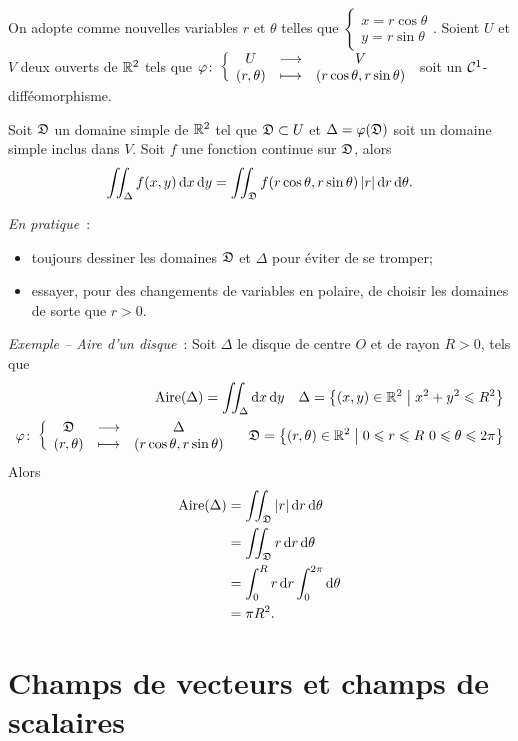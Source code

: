 \begin{theo}
  On adopte comme nouvelles variables $r$ et $\theta$ telles que $\begin{cases} x=r\cos\theta \\ y=r\sin\theta \end{cases}$. Soient $U$ et $V$ deux ouverts de $\mathbb{R}^2$ tels que $\varphi\colon \left\{\begin{array}{ccc} U & \longrightarrow &V\\ (r, \theta) & \longmapsto & (r\cos\theta, r\sin\theta) \end{array} \right.$ soit un $\mathcal{C}^{1}$-difféomorphisme.

Soit $\mathfrak{D}$ un domaine simple de $\mathbb{R}^2$ tel que $\mathfrak{D} \subset U$ et $\Delta=\varphi(\mathfrak{D})$ soit un domaine simple inclus dans $V$. Soit $f$ une fonction continue sur $\mathfrak{D}$, alors
\begin{equation}
   \iint_\Delta f(x,y)\mathop{}\mathopen{}\mathrm{d} x \mathop{}\mathopen{}\mathrm{d} y = \iint_{\mathfrak{D}} f(r\cos\theta, r\sin\theta) \left\lvert r\right\rvert\mathop{}\mathopen{}\mathrm{d} r \mathop{}\mathopen{}\mathrm{d} \theta.
\end{equation}
\end{theo}

\emph{En pratique}~:
\begin{itemize}
\item toujours dessiner les domaines $\mathfrak{D}$ et $\Delta$ pour éviter de se tromper;
\item essayer, pour des changements de variables en polaire, de choisir les domaines de sorte que $r>0$.
\end{itemize}

\emph{Exemple -- Aire d'un disque}~: Soit $\Delta$ le disque de centre $O$ et de rayon $R>0$, tels que
 \begin{align}
   \text{Aire}(\Delta) = \iint_\Delta \mathop{}\mathopen{}\mathrm{d} x \mathop{}\mathopen{}\mathrm{d} y \quad \Delta=\left\{(x,y)\in\mathbb{R}^2\mathrel{}\middle|\mathrel{}x^2+y^2\leqslant R^2\right\} \\
   \varphi\colon \left\{\begin{array}{ccc} \mathfrak{D} & \longrightarrow &\Delta\\ (r, \theta) & \longmapsto & (r\cos\theta, r\sin\theta) \end{array} \right. \quad \mathfrak{D}=\left\{(r,\theta)\in\mathbb{R}^2\mathrel{}\middle|\mathrel{}0 \leqslant r \leqslant R \ 0 \leqslant \theta \leqslant 2\pi\right\}
 \end{align}
Alors
\begin{align}
  \text{Aire}(\Delta) &= \iint_{\mathfrak{D}} \left\lvert r\right\rvert\mathop{}\mathopen{}\mathrm{d} r \mathop{}\mathopen{}\mathrm{d} \theta \\
  &= \iint_{\mathfrak{D}} r\mathop{}\mathopen{}\mathrm{d} r \mathop{}\mathopen{}\mathrm{d} \theta \\
  &=\int_0^R r\mathop{}\mathopen{}\mathrm{d} r \int_0^{2\pi}\mathop{}\mathopen{}\mathrm{d} \theta \\
  &=\pi R^2.
\end{align}


\section{Champs de vecteurs et champs de scalaires}

